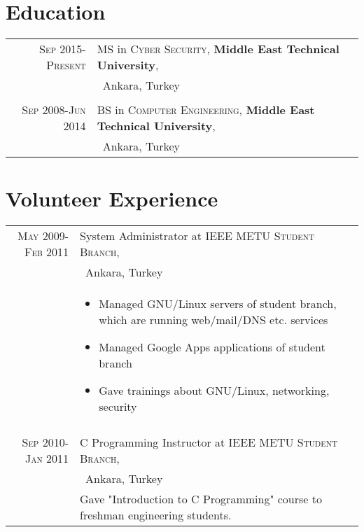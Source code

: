 \documentclass[a4paper,10pt]{article}
\begin{document}
\section{Education}
\begin{tabular}{rl} 
 \textsc{Sep 2015-Present} & MS in \textsc{Cyber Security}, \textbf{Middle East Technical University}, \\&\ Ankara, Turkey\\&\\
\textsc{Sep 2008-Jun 2014} & BS in \textsc{Computer Engineering}, \textbf{Middle East Technical University}, \\&\ Ankara, Turkey
\end{tabular}

\section{Volunteer Experience}
\begin{tabular}{r|p{11cm}}
\textsc{May 2009-Feb 2011} & System Administrator at \textsc{IEEE METU Student Branch}, \\&\ Ankara, Turkey \\&\footnotesize{
\begin{itemize}
\item Managed GNU/Linux servers of student branch, which are running web/mail/DNS etc. services
\item Managed Google Apps applications of student branch
\item Gave trainings about GNU/Linux, networking, security
\end{itemize}
}\\\multicolumn{2}{c}{} \\
\textsc{Sep 2010-Jan 2011} & C Programming Instructor at \textsc{IEEE METU Student Branch}, \\&\ Ankara, Turkey \\&\footnotesize{Gave "Introduction to C Programming" course to freshman engineering students.}
\end{tabular}

\end{document}
